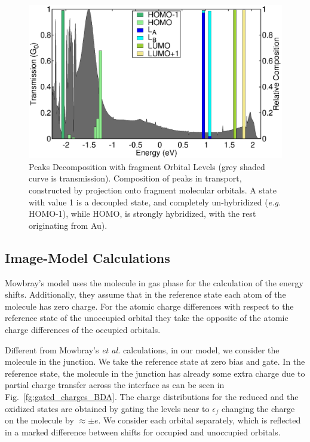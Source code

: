 \documentclass[aip,jcp,a4paper,reprint,floatfix,superscriptaddress]{revtex4-1}
\newcommand{\etal}{\emph{et al.}\xspace}
\newcommand{\eg}{\emph{e.g.}\xspace}
\begin{document}
\begin{figure}
   \includegraphics[width=\columnwidth]{BDA-decomposition}
\caption{Peaks Decomposition with fragment Orbital Levels (grey shaded curve is transmission). Composition of peaks in transport, constructed by projection onto fragment molecular orbitals. A state with value 1 is a decoupled state, and completely un-hybridized (\eg HOMO-1), while HOMO, is strongly hybridized, with the rest originating from Au).}\label{fg:BDA-peak-composition}
\end{figure}



\subsection{Image-Model Calculations}\label{imagemodelcalcsBDA}

Mowbray's model uses the molecule in gas phase for the calculation of the energy shifts. Additionally, they assume that in the reference state each atom of the molecule has zero charge. For the atomic charge differences with respect to the reference state of the unoccupied orbital they take the opposite of the atomic charge differences of the occupied orbitals.

Different from Mowbray's \etal calculations, in our model, we consider the molecule in the junction. We take the reference state at zero bias and gate. In the reference state, the molecule in the junction has already some extra charge due to partial charge transfer across the interface \cite{Thygesen2009} as can be seen in Fig.~\ref{fg:gated_charges_BDA}. The charge distributions for the reduced and the oxidized states are obtained by gating the levels near to $\epsilon_f$ changing the charge on the molecule by $\approx \pm e$. We consider each orbital separately, which is reflected in a marked difference between shifts for occupied and unoccupied orbitals.
\end{document}
